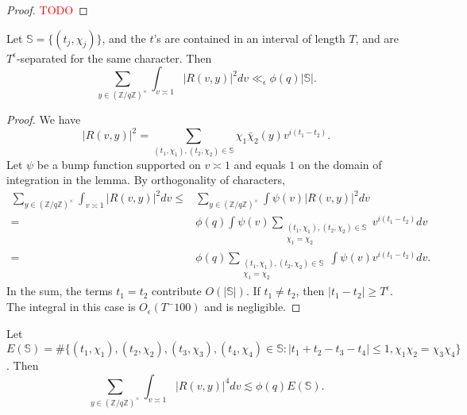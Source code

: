 \begin{proof}
    \textcolor{red}{TODO}
\end{proof}


\begin{lemma} \label{secondmoment}
    Let $\mathbb{S}=\{(t_j,\chi_j)\}$, and the $t$'s are contained in an interval of length $T$, and are $T^\epsilon$-separated for the same character. Then \[
        \sum_{y\in (\mathbb{Z}/q\mathbb{Z})^\times} \int_{v\asymp 1} 
        \left|R\left(v,y\right)\right|^2dv \ll_{\epsilon} \phi(q)|\mathbb{S}|.
    \]
\end{lemma}
\begin{proof}
    We have \[
    |R(v,y)|^2 = \sum_{(t_1,\chi_1),(t_2,\chi_2)\in \mathbb{S}}
    \chi_1\bar{\chi}_2(y)v^{i(t_1-t_2)}.
    \]
    Let $\psi$ be a bump function supported on $v\asymp 1$ and equals $1$ on the domain of integration in the lemma.
    By orthogonality of characters, \begin{align*}
        \sum_{y\in (\mathbb{Z}/q\mathbb{Z})^\times} \int_{v\asymp 1} 
        \left|R\left(v,y\right)\right|^2dv 
        \leq&\sum_{y\in (\mathbb{Z}/q\mathbb{Z})^\times} \int 
        \psi(v)\left|R\left(v,y\right)\right|^2dv 
        \\=&
        \phi(q)\int \psi(v)
        \sum_{\substack{(t_1,\chi_1),(t_2,\chi_2)\in \mathbb{S}\\ \chi_1=\chi_2}}v^{i(t_1-t_2)}
        dv\\
        =&
        \phi(q)\sum_{\substack{(t_1,\chi_1),(t_2,\chi_2)\in \mathbb{S}\\ \chi_1=\chi_2}}\int \psi(v)
        v^{i(t_1-t_2)}
        dv.
    \end{align*}
    In the sum, the terms $t_1=t_2$ contribute $O(|\mathbb{S}|)$. If $t_1\neq t_2$, then $|t_1-t_2|\geq T^\epsilon$. The integral in this case is $O_\epsilon(T^-100)$ and is negligible.
\end{proof}
\begin{lemma}\label{fourthmoment}
    Let $E(\mathbb{S})=\#\{(t_1,\chi_1),(t_2,\chi_2),(t_3,\chi_3),(t_4,\chi_4)\in \mathbb{S}  :  |t_1+t_2-t_3-t_4|\leq 1, \chi_1\chi_2=\chi_3\chi_4\}$. Then \[
        \sum_{y\in (\mathbb{Z}/q\mathbb{Z})^\times} \int_{v\asymp 1} 
        \left|R\left(v,y\right)\right|^4dv  \lesssim \phi(q)E(\mathbb{S}).
    \]
\end{lemma}

